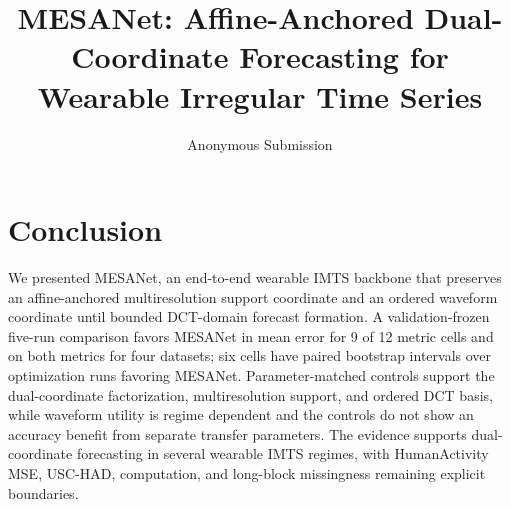 ﻿\documentclass[letterpaper]{article}
\title{MESANet: Affine-Anchored Dual-Coordinate Forecasting for Wearable Irregular Time Series}
\author{Anonymous Submission}
\date{}
\begin{document}
\maketitle





\FloatBarrier

\section{Conclusion}
We presented MESANet, an end-to-end wearable IMTS backbone that preserves an
affine-anchored multiresolution support coordinate and an ordered waveform
coordinate until bounded DCT-domain forecast formation. A validation-frozen
five-run comparison favors MESANet in mean error for 9 of 12 metric cells and
on both metrics for four datasets; six cells have paired bootstrap intervals
over optimization runs favoring MESANet. Parameter-matched controls support the dual-coordinate
factorization, multiresolution support, and ordered DCT basis, while waveform
utility is regime dependent and the controls do not show an accuracy benefit
from separate transfer parameters. The evidence supports dual-coordinate forecasting in several wearable
IMTS regimes, with HumanActivity MSE, USC-HAD, computation, and long-block
missingness remaining explicit boundaries.

\clearpage


\end{document}

